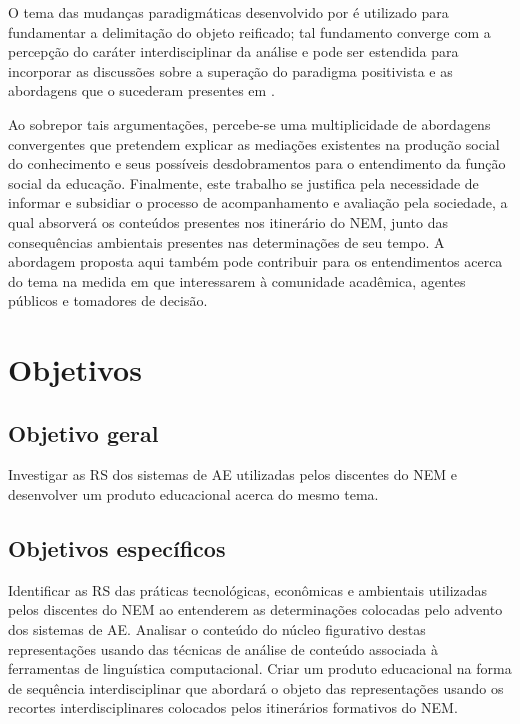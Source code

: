 \documentclass[
  12pt,       %
  openright,      %
  twoside,      %
  a4paper,      %
  english,      %
  french,       %
  spanish,      %
  brazil        %
  ]{abntex2}
\begin{document}
O tema das mudanças paradigmáticas desenvolvido por  é utilizado para fundamentar a delimitação do objeto reificado; tal fundamento converge com a percepção do caráter interdisciplinar da análise e pode ser estendida para incorporar as discussões sobre a superação do paradigma positivista e as abordagens que o sucederam presentes em .

Ao sobrepor tais argumentações, percebe-se uma multiplicidade de abordagens convergentes que pretendem explicar as mediações existentes na produção social do conhecimento e seus possíveis desdobramentos para o entendimento da função social da educação.
Finalmente, este trabalho se justifica pela necessidade de informar e subsidiar o processo de acompanhamento e avaliação pela sociedade, a qual absorverá os conteúdos presentes nos itinerário do NEM, junto das consequências ambientais presentes nas determinações de seu tempo. A abordagem proposta aqui também pode contribuir para os entendimentos acerca do tema na medida em que interessarem à comunidade acadêmica, agentes públicos e tomadores de decisão.



\chapter{Objetivos}
\section{Objetivo geral}

Investigar as RS dos sistemas de AE utilizadas pelos discentes do NEM e desenvolver um produto educacional acerca do mesmo tema.

\section{Objetivos específicos}

Identificar as RS das práticas tecnológicas, econômicas e ambientais utilizadas pelos discentes do NEM ao entenderem as determinações colocadas pelo advento dos sistemas de AE.
Analisar o conteúdo do núcleo figurativo destas representações usando das técnicas de análise de conteúdo associada à ferramentas de linguística computacional.
Criar um produto educacional na forma de sequência interdisciplinar que abordará o objeto das representações usando os recortes interdisciplinares colocados pelos itinerários formativos do NEM.
\end{document}
